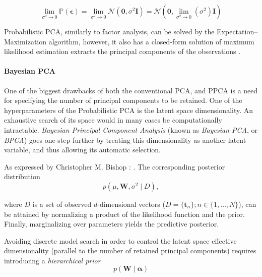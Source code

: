 \begin{equation}\label{eq:ppca-to-pca}
    \lim_{\sigma^2 \to 0} \mathbb{P}(\boldsymbol{\epsilon}) = \lim_{\sigma^2 \to 0} \mathcal{N}(\mathbf{0}, \sigma^2\mathbf{I}) = \mathcal{N}(\mathbf{0}, \lim_{\sigma^2 \to 0}(\sigma^2)\mathbf{I})
\end{equation}

\vspace{\baselineskip}
Probabilistic PCA, similarly to factor analysis, can be solved by the Expectation–Maximization algorithm, however, it also has a closed-form solution of maximum likelihood estimation extracts the principal components of the observations \cite{Tipping1999}.


\paragraph{Bayesian PCA}\label{par:bpca}
One of the biggest drawbacks of both the conventional PCA, and PPCA is a need for specifying the number of principal components to be retained. One of the hyperparameters of the Probabilistic PCA is the latent space dimensionality. An exhaustive search of its space would in many cases be computationally intractable. \textit{Bayesian Principal Component Analysis} (known as \textit{Bayesian PCA}, or \textit{BPCA}) goes one step further by treating this dimensionality as another latent variable, and thus allowing its automatic selection. 

\vspace{\baselineskip}
As expressed by Christopher M. Bishop \cite{Bishop1998}: . The corresponding posterior distribution
\begin{equation*}
    p(\mu, \mathbf{W}, \sigma^2 \mid D),
\end{equation*}

\noindent where $D$ is a set of observed $d$-dimensional vectors ($D = \{\mathbf{t}_n\}; n \in \{1, \dots, N\}$), can be attained by normalizing a product of the likelihood function and the prior. Finally, marginalizing over parameters yields the predictive posterior.

\vspace{\baselineskip}
Avoiding discrete model search in order to control the latent space effective dimensionality (parallel to the number of retained principal components) requires introducing a \textit{hierarchical prior} 
\begin{equation*}
    p(\mathbf{W} \mid \boldsymbol{\alpha})
\end{equation*}

